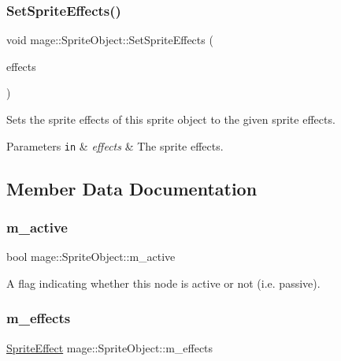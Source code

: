 \subsubsection{\texorpdfstring{Set\+Sprite\+Effects()}{SetSpriteEffects()}}
{\footnotesize\ttfamily void mage\+::\+Sprite\+Object\+::\+Set\+Sprite\+Effects (\begin{DoxyParamCaption}\item[{\hyperlink{namespacemage_a9cfe18123066ba4236f548f9de75d881}{Sprite\+Effect}}]{effects }\end{DoxyParamCaption})\hspace{0.3cm}{\ttfamily [noexcept]}}

Sets the sprite effects of this sprite object to the given sprite effects.


\begin{DoxyParams}[1]{Parameters}
\mbox{\tt in}  & {\em effects} & The sprite effects. \\
\hline
\end{DoxyParams}


\subsection{Member Data Documentation}
\hypertarget{classmage_1_1_sprite_object_a6694bb9cade83917202cf9ca6d359e81}{}\label{classmage_1_1_sprite_object_a6694bb9cade83917202cf9ca6d359e81} 
\subsubsection{\texorpdfstring{m\+\_\+active}{m\_active}}
{\footnotesize\ttfamily bool mage\+::\+Sprite\+Object\+::m\+\_\+active\hspace{0.3cm}{\ttfamily [private]}}

A flag indicating whether this node is active or not (i.\+e. passive). \hypertarget{classmage_1_1_sprite_object_a270f73b8d316f72c4228854d08a6d2ea}{}\label{classmage_1_1_sprite_object_a270f73b8d316f72c4228854d08a6d2ea} 
\subsubsection{\texorpdfstring{m\+\_\+effects}{m\_effects}}
{\footnotesize\ttfamily \hyperlink{namespacemage_a9cfe18123066ba4236f548f9de75d881}{Sprite\+Effect} mage\+::\+Sprite\+Object\+::m\+\_\+effects\hspace{0.3cm}{\ttfamily [private]}}

